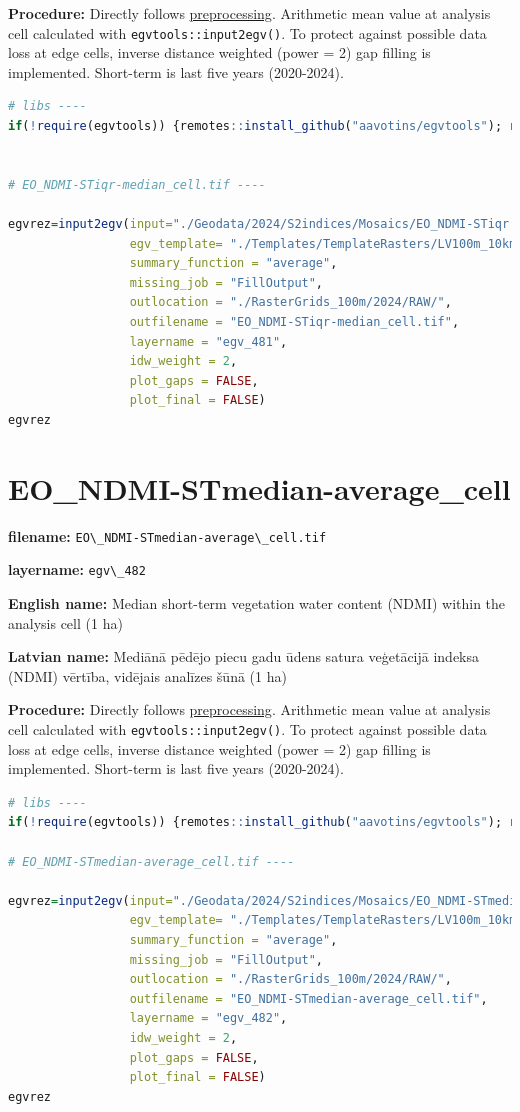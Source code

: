 \documentclass[
]{book}
\newcommand{\passthrough}[1]{#1}
\begin{document}
\textbf{Procedure:} Directly follows \hyperref[Ch04.13]{preprocessing}. Arithmetic mean value at analysis cell
calculated with \passthrough{\lstinline!egvtools::input2egv()!}. To protect against possible data loss at edge cells,
inverse distance weighted (power = 2) gap filling is implemented. Short-term is last five years (2020-2024).

\begin{lstlisting}[language=R]
# libs ----
if(!require(egvtools)) {remotes::install_github("aavotins/egvtools"); require(egvtools)}


# EO_NDMI-STiqr-median_cell.tif ----

egvrez=input2egv(input="./Geodata/2024/S2indices/Mosaics/EO_NDMI-STiqr.tif",
                 egv_template= "./Templates/TemplateRasters/LV100m_10km.tif",
                 summary_function = "average",
                 missing_job = "FillOutput",
                 outlocation = "./RasterGrids_100m/2024/RAW/",
                 outfilename = "EO_NDMI-STiqr-median_cell.tif",
                 layername = "egv_481",
                 idw_weight = 2,
                 plot_gaps = FALSE,
                 plot_final = FALSE)
egvrez
\end{lstlisting}

\section{EO\_NDMI-STmedian-average\_cell}\label{ch06.482}

\textbf{filename:} \passthrough{\lstinline!EO\_NDMI-STmedian-average\_cell.tif!}

\textbf{layername:} \passthrough{\lstinline!egv\_482!}

\textbf{English name:} Median short-term vegetation water content (NDMI) within the analysis cell (1 ha)

\textbf{Latvian name:} Mediānā pēdējo piecu gadu ūdens satura veģetācijā indeksa (NDMI) vērtība, vidējais analīzes šūnā (1 ha)

\textbf{Procedure:} Directly follows \hyperref[Ch04.13]{preprocessing}. Arithmetic mean value at analysis cell
calculated with \passthrough{\lstinline!egvtools::input2egv()!}. To protect against possible data loss at edge cells,
inverse distance weighted (power = 2) gap filling is implemented. Short-term is last five years (2020-2024).

\begin{lstlisting}[language=R]
# libs ----
if(!require(egvtools)) {remotes::install_github("aavotins/egvtools"); require(egvtools)}

# EO_NDMI-STmedian-average_cell.tif ----

egvrez=input2egv(input="./Geodata/2024/S2indices/Mosaics/EO_NDMI-STmedian.tif",
                 egv_template= "./Templates/TemplateRasters/LV100m_10km.tif",
                 summary_function = "average",
                 missing_job = "FillOutput",
                 outlocation = "./RasterGrids_100m/2024/RAW/",
                 outfilename = "EO_NDMI-STmedian-average_cell.tif",
                 layername = "egv_482",
                 idw_weight = 2,
                 plot_gaps = FALSE,
                 plot_final = FALSE)
egvrez
\end{lstlisting}
\end{document}
